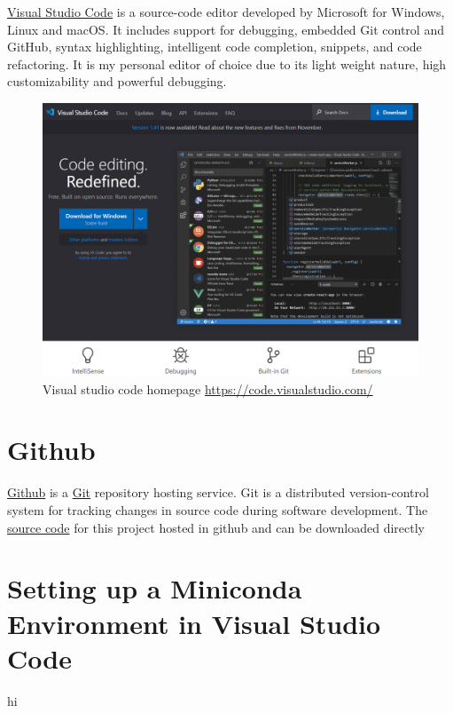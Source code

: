 \documentclass[10pt,a4paper]{article}
\begin{document}
		\href{https://code.visualstudio.com/}{Visual Studio Code} is a source-code editor developed by Microsoft for Windows, Linux and macOS. It includes support for debugging, embedded Git control and GitHub, syntax highlighting, intelligent code completion, snippets, and code refactoring. It is my personal editor of choice due to its light weight nature, high customizability and powerful debugging.
		\begin{figure}[h]
			\centering
			\includegraphics[scale=0.25]{figures/vsc_page.PNG}
			\caption{Visual studio code homepage \url{https://code.visualstudio.com/}}
		\end{figure}
	\section{Github}
		\href{https://github.com/}{Github} is a \href{https://git-scm.com/}{Git} repository hosting service. Git is a distributed version-control system for tracking changes in source code during software development. The \href{https://github.com/hj40/pymethods}{source code} for this project hosted in github and can be downloaded directly 
	\section{Setting up a Miniconda Environment in Visual Studio Code}
		hi
		
		
\end{document}
